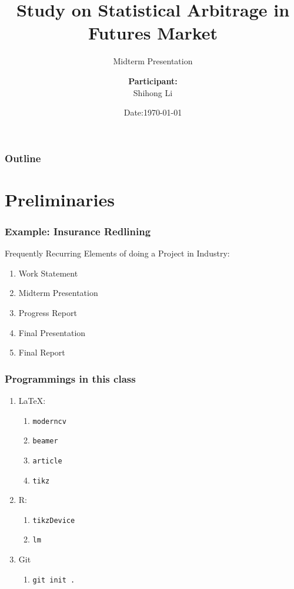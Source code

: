 \documentclass[compress,handout,10pt]{beamer}
\title{{\color{black} \LARGE Study on Statistical Arbitrage in Futures Market\newline} }
\subtitle{{\color{black} Midterm Presentation\large } }
\author{ 
    {\bf{Participant:}} \\ 
Shihong Li\\ 
    \vspace{5pt}
}
\institute{
{\bf{Sponsor:}}\\
Greenwoods Asset Management Ltd.\\
\vspace{5pt}
}
\date{\mygreen Date:\today}
\let\olditem\item
\renewcommand{\item}{\setlength{\itemsep}{0.5\baselineskip}\olditem}
\begin{document}
\begin{frame}[plain]
    \titlepage
\end{frame}

\begin{frame}
    \frametitle{Outline}
    \tableofcontents
\end{frame}

\section{Preliminaries}

\begin{frame}
    \frametitle{Example: Insurance Redlining}
    Frequently Recurring Elements of doing a Project in Industry:
    \vspace{7pt}
             \begin{enumerate}
                 \item Work Statement
                 \item Midterm Presentation
                 \item Progress Report
                 \item Final Presentation
                 \item Final Report
             \end{enumerate}
\end{frame}

\begin{frame}
    \frametitle{Programmings in this class}
    \begin{enumerate}
        \item \LaTeX: 
            \begin{enumerate}
                \item \texttt{moderncv}
                \item \texttt{beamer}
                \item \texttt{article}
                \item \texttt{tikz}
            \end{enumerate}
        \item R:
            \begin{enumerate}
                \item \texttt{tikzDevice}
                \item \texttt{lm}
            \end{enumerate}
        \item Git
            \begin{enumerate}
                \item \texttt{git init .}
            \end{enumerate}
    \end{enumerate}
\end{frame}
\end{document}
